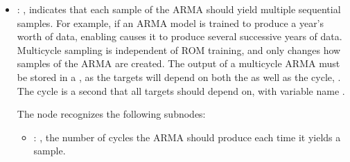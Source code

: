 \begin{itemize}
    \item {}: ,
      indicates that each sample of the ARMA should yield
      multiple sequential samples. For example, if an ARMA model is trained to produce a year's
      worth of data,                                                    enabling
       causes it to produce several successive years of data. Multicycle
      sampling                                                    is independent of ROM training,
      and only changes how samples of the ARMA are created.
      \nb The output of a multicycle ARMA must be stored in a , as the targets will
      depend                                                    on both the 
      as well as the cycle, . The cycle is a second
       that all targets should depend on, with variable name .

      The  node recognizes the following subnodes:
      \begin{itemize}
        \item {}: ,
          the number of cycles the ARMA should produce
          each time it yields a sample.


\end{itemize}
\end{itemize}
